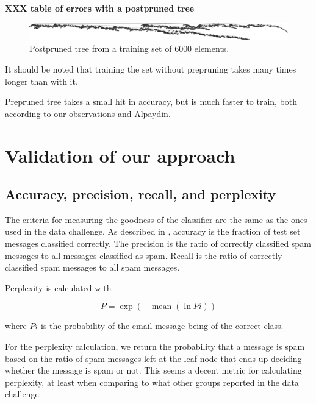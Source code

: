 \documentclass[a4paper,10pt]{article}
\newcommand{\XXX}[1]{{\bf XXX #1}}
\begin{document}
\XXX{table of errors with a postpruned tree}
\begin{figure}[h]
  \centering
  \begin{minipage}[c]{1.0\textwidth}
    \centering
\includegraphics[width=130mm]{postpruned-pruned-6000.png}
  \end{minipage}
  \caption{Postpruned tree from a training set of 6000 elements.}
  \label{fig:no-pruning-6000}
\end{figure}


It should be noted that training the set without prepruning takes many
times longer than with it.

Prepruned tree takes a small hit in accuracy, but is much faster to
train, both according to our observations and 
Alpaydin\cite[p. 195 mun kirjassa]{alpaydin2004}.

\section{Validation of our approach}

\subsection{Accuracy, precision, recall, and perplexity}

The criteria for measuring the goodness of the classifier are the same
as the ones used in the data challenge.  As described in
\cite{termproject}, accuracy is the fraction of test set messages
classified correctly.  The precision is the ratio of correctly
classified spam messages to all messages classified as spam.  Recall is
the ratio of correctly classified spam messages to all spam messages.

Perplexity is calculated with

\begin{equation}
P = \exp(-\operatorname{mean}(\ln{Pi}))
\end{equation}

where $Pi$ is the probability of the email message being of the correct
class.

For the perplexity calculation, we return the probability that a message
is spam based on the ratio of spam messages left at the leaf node that
ends up deciding whether the message is spam or not.  This seems a
decent metric for calculating perplexity, at least when comparing to
what other groups reported in the data challenge.
\end{document}
